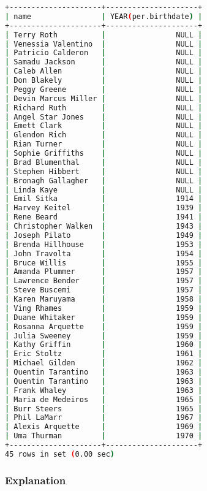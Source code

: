 \begin{lstlisting}[language=bash]
+---------------------+---------------------+
| name                | YEAR(per.birthdate) |
+---------------------+---------------------+
| Terry Roth          |                NULL |
| Venessia Valentino  |                NULL |
| Patricio Calderon   |                NULL |
| Samadu Jackson      |                NULL |
| Caleb Allen         |                NULL |
| Don Blakely         |                NULL |
| Peggy Greene        |                NULL |
| Devin Marcus Miller |                NULL |
| Richard Ruth        |                NULL |
| Angel Star Jones    |                NULL |
| Emett Clark         |                NULL |
| Glendon Rich        |                NULL |
| Rian Turner         |                NULL |
| Sophie Griffiths    |                NULL |
| Brad Blumenthal     |                NULL |
| Stephen Hibbert     |                NULL |
| Bronagh Gallagher   |                NULL |
| Linda Kaye          |                NULL |
| Emil Sitka          |                1914 |
| Harvey Keitel       |                1939 |
| Rene Beard          |                1941 |
| Christopher Walken  |                1943 |
| Joseph Pilato       |                1949 |
| Brenda Hillhouse    |                1953 |
| John Travolta       |                1954 |
| Bruce Willis        |                1955 |
| Amanda Plummer      |                1957 |
| Lawrence Bender     |                1957 |
| Steve Buscemi       |                1957 |
| Karen Maruyama      |                1958 |
| Ving Rhames         |                1959 |
| Duane Whitaker      |                1959 |
| Rosanna Arquette    |                1959 |
| Julia Sweeney       |                1959 |
| Kathy Griffin       |                1960 |
| Eric Stoltz         |                1961 |
| Michael Gilden      |                1962 |
| Quentin Tarantino   |                1963 |
| Quentin Tarantino   |                1963 |
| Frank Whaley        |                1963 |
| Maria de Medeiros   |                1965 |
| Burr Steers         |                1965 |
| Phil LaMarr         |                1967 |
| Alexis Arquette     |                1969 |
| Uma Thurman         |                1970 |
+---------------------+---------------------+
45 rows in set (0.00 sec)
\end{lstlisting}

\subsubsection{Explanation}


